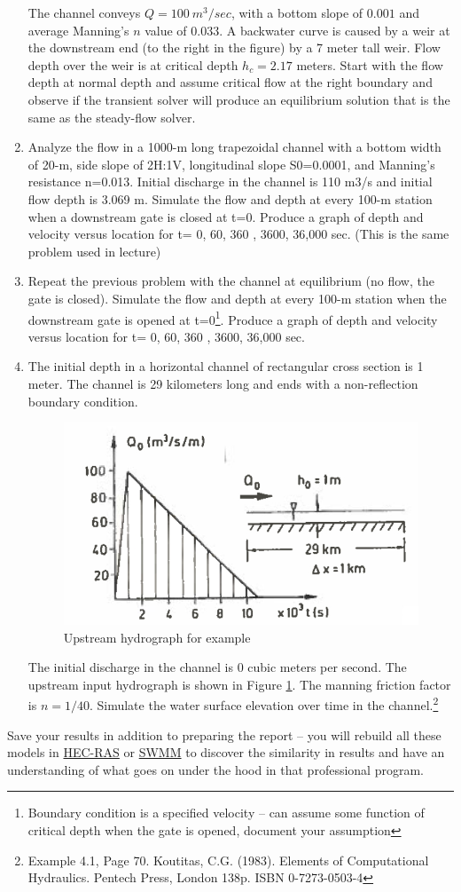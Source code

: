 \documentclass[12pt]{article}
\begin{document}
\begin{enumerate}
The channel conveys $Q=100~m^3/sec$, with a bottom slope of $0.001$ and average Manning's $n$ value of $0.033$.  
A backwater curve is caused by a weir at the downstream end (to the right in the figure) by a 7 meter tall weir.
Flow depth over the weir is at critical depth $h_c = 2.17$ meters.  Start with the flow depth at normal depth and assume critical flow at the right boundary and observe if the transient solver will produce an equilibrium solution that is the same as the steady-flow solver.  

\item Analyze the flow in a 1000-m long trapezoidal channel with a bottom width of 20-m, side slope of 2H:1V, longitudinal slope S0=0.0001, and Manning's resistance n=0.013. Initial discharge in the channel is 110 m3/s and initial flow depth is 3.069 m. Simulate the flow and depth at every 100-m station when a downstream gate is closed at t=0. Produce a graph of depth and velocity versus location for t= 0, 60, 360 , 3600, 36,000 sec. (This is the same problem used in lecture)

\item Repeat the previous problem with the channel at equilibrium (no flow, the gate is closed).  Simulate the flow and depth at every 100-m station when the  downstream gate is opened at t=0\footnote{Boundary condition is a specified velocity -- can assume some function of critical depth when the gate is opened, document your assumption}. Produce a graph of depth and velocity versus location for t= 0, 60, 360 , 3600, 36,000 sec. 

\item The initial depth in a horizontal channel of rectangular cross section is 1 meter. 
The channel is 29 kilometers long and ends with a non-reflection boundary condition.
\newpage
\begin{figure}[h!] %
   \centering
   \includegraphics[width=4.25in]{upstreamHydro.jpg} 
   \caption{Upstream hydrograph for example}
   \label{fig:upstreamHydro}
\end{figure}

The initial discharge in the channel is 0 cubic meters per second. 
The upstream input hydrograph is shown in Figure \ref{fig:upstreamHydro}.
The manning friction factor is $n=1/40$.
Simulate the water surface elevation over time in the channel.\footnote{Example 4.1, Page 70. Koutitas, C.G. (1983). Elements of Computational Hydraulics. Pentech Press, London 138p. ISBN 0-7273-0503-4 }
\end{enumerate}

Save your results in addition to preparing the report -- you will rebuild all these models in \url{HEC-RAS} or \url{SWMM} to discover the similarity in results and have an understanding of what goes on under the hood in that professional program.
\end{document}
